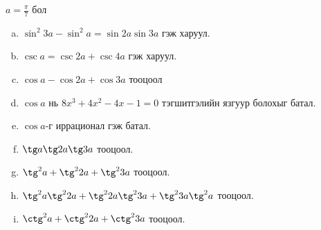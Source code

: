 \documentclass[10pt,a4paper,oneside]{book}
\begin{document}
\Problem
$a=\frac{\pi}{7}$ бол
\begin{enumerate}[(a)]
\item
$\sin^2 3a - \sin^2 a = \sin 2a \sin 3a$ гэж харуул.
\item
$\csc a = \csc 2a + \csc 4a$  гэж харуул.
\item
$\cos a - \cos 2a + \cos 3a$ тооцоол
\item
$\cos a$ нь $8x^3 + 4x^2 -4x-1=0$ тэгшитгэлийн язгуур болохыг батал.
\item
$\cos a$-г иррационал гэж батал.
\item
$\tg a\tg 2a \tg 3a$ тооцоол.
\item
$\tg^2 a + \tg^2 2a + \tg^2 3a$ тооцоол.
\item
$\tg^2 a\tg^2 2a + \tg^2 2a\tg^2 3a + \tg^2 3a\tg^2 a$ тооцоол.
\item
$\ctg^2 a + \ctg^2 2a + \ctg^2 3a$ тооцоол.

\end{enumerate}
\end{document}
